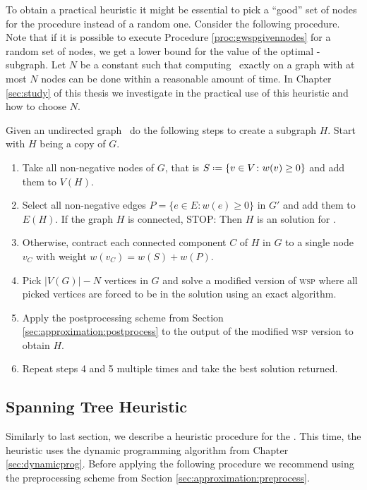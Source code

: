 To obtain a practical heuristic it might be essential to pick a ``good'' set of nodes for the procedure instead of a random one. Consider the following procedure. Note that if it is possible to execute Procedure \ref{proc:gwspgivennodes} for a random set of nodes, we get a lower bound for the value of the optimal \maxWSP-subgraph. Let $N$ be a constant such that computing \maxWSP\ exactly on a graph with at most $N$ nodes can be done within a reasonable amount of time. In Chapter \ref{sec:study} of this thesis we investigate in the practical use of this heuristic and how to choose $N$.

\begin{procedure}
	\label{proc:wspnodes}
	Given an undirected graph \ugraph\ do the following steps to create a subgraph $H$. Start with $H$ being a copy of $G$.
	\begin{enumerate}		
		\item Take all non-negative nodes of $G$, that is $S \defeq \{ v \in V \colon w(v) \geq 0 \}$ and add them to $V(H)$.
		\item Select all non-negative edges $P = \{e \in E \colon w(e) \geq 0\}$ in $G'$ and add them to $E(H)$. If the graph $H$ is connected, STOP: Then $H$ is an solution for \maxWSP.
		\item Otherwise, contract each connected component $C$ of $H$ in $G$ to a single node $v_C$ with weight $w(v_C) = w(S) + w(P)$.
		\item Pick $|V(G)| - N$ vertices in $G$ and solve a modified version of \textsc{wsp} where all picked vertices are forced to be in the solution using an exact algorithm.
		\item Apply the postprocessing scheme from Section \ref{sec:approximation:postprocess} to the output of the modified \textsc{wsp} version to obtain $H$.
		\item Repeat steps 4 and 5 multiple times and take the best solution returned.
	\end{enumerate}
\end{procedure}


\subsection{Spanning Tree Heuristic}
\label{sec:approximation:spanningtree}

Similarly to last section, we describe a heuristic procedure for the \WSP. This time, the heuristic uses the dynamic programming algorithm from Chapter \ref{sec:dynamicprog}. Before applying the following procedure we recommend using the preprocessing scheme from Section \ref{sec:approximation:preprocess}.\medskip

